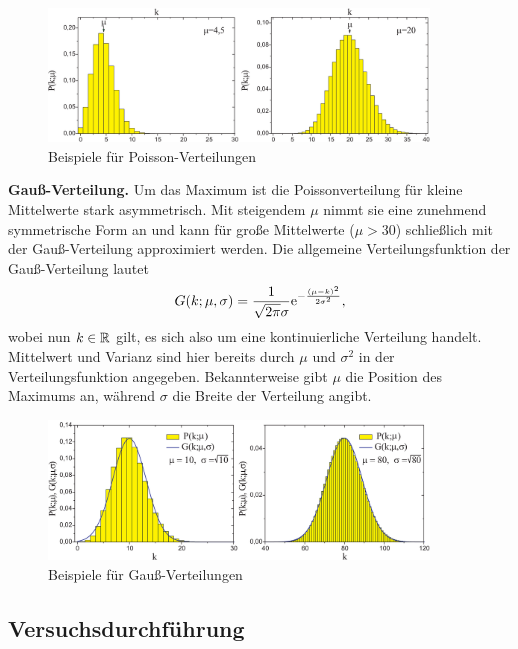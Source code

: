 \begin{figure}[H]
  \centering
  \includegraphics[width=0.9\textwidth]{files/poisson_distr_examples.png}
  \caption{Beispiele für Poisson-Verteilungen}
  \label{fig:poisson_distr_examples}
\end{figure}

\textbf{Gauß-Verteilung.} Um das Maximum ist die Poissonverteilung für kleine Mittelwerte stark asymmetrisch. Mit steigendem $\mu$ nimmt sie eine zunehmend symmetrische Form an und kann für große Mittelwerte ($\mu > 30$) schließlich mit der Gauß-Verteilung approximiert werden. Die allgemeine Verteilungsfunktion der Gauß-Verteilung lautet
\begin{align}
  G(k;\mu,\sigma) = \frac{1}{\sqrt{2\pi} \sigma}\text{e}^{-\frac{(\mu - k)^2}{2\sigma^2}}, \label{eq:gauss_distr}
\end{align}
wobei nun $k \in \mathbb{R}$ gilt, es sich also um eine kontinuierliche Verteilung handelt. Mittelwert und Varianz sind hier bereits durch $\mu$ und $\sigma^2$ in der Verteilungsfunktion angegeben. Bekannterweise gibt $\mu$ die Position des Maximums an, während $\sigma$ die Breite der Verteilung angibt.

\begin{figure}[H]
  \centering
  \includegraphics[width=0.9\textwidth]{files/gaus_distr_examples.png}
  \caption{Beispiele für Gauß-Verteilungen}
  \label{fig:gaus_distr_examples}
\end{figure}


\subsection{Versuchsdurchführung}

